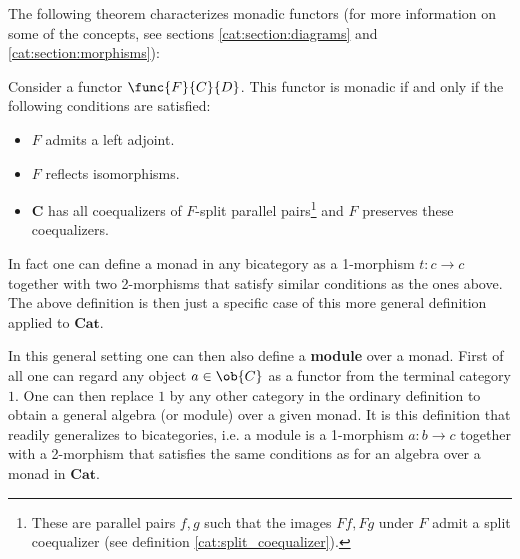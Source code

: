     The following theorem characterizes monadic functors (for more information on some of the concepts, see sections \ref{cat:section:diagrams} and \ref{cat:section:morphisms}):
    \begin{theorem}
        Consider a functor $\func{F}{C}{D}$. This functor is monadic if and only if the following conditions are satisfied:
        \begin{itemize}
            \item $F$ admits a left adjoint.
            \item $F$ reflects isomorphisms.
            \item $\mathbf{C}$ has all coequalizers of $F$-split parallel pairs\footnote{These are parallel pairs $f,g$ such that the images $Ff, Fg$ under $F$ admit a split coequalizer (see definition \ref{cat:split_coequalizer}).} and $F$ preserves these coequalizers.
        \end{itemize}
    \end{theorem}


    \begin{remark}
        In fact one can define a monad in any bicategory as a 1-morphism $t:c\rightarrow c$ together with two 2-morphisms that satisfy similar conditions as the ones above. The above definition is then just a specific case of this more general definition applied to $\mathbf{Cat}$.

        In this general setting one can then also define a \textbf{module} over a monad. First of all one can regard any object $a\in\ob{C}$ as a functor from the terminal category $1$. One can then replace $1$ by any other category in the ordinary definition to obtain a general algebra (or module) over a given monad. It is this definition that readily generalizes to bicategories, i.e. a module is a 1-morphism $a:b\rightarrow c$ together with a 2-morphism that satisfies the same conditions as for an algebra over a monad in $\mathbf{Cat}$.
    \end{remark}

